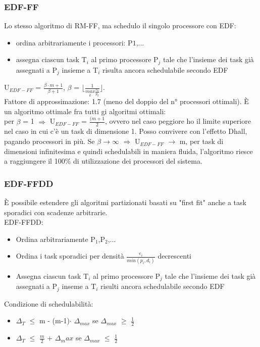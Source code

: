 \documentclass[12pt, oneside]{extbook}
\begin{document}
\subsubsection{EDF-FF}
Lo stesso algoritmo di RM-FF, ma schedulo il singolo processore con EDF:
\begin{itemize}
\item ordina arbitrariamente i processori: P${1}$,...
\item assegna ciascun task T$_{i}$ al primo processore P$_{j}$ tale che l'insieme dei task già assegnati a P$_{j}$ insieme a T$_{i}$ risulta ancora schedulabile secondo EDF
\end{itemize}
U$_{EDF-FF}$ = $\frac{\beta \cdot m + 1}{\beta + 1}$, $\beta$ = $\lfloor \frac{1}{\underset{k}{max}\frac{e_k}{p_k}}\rfloor$.\\ Fattore di approssimazione: 1.7 (meno del doppio del n° processori ottimali). È un algoritmo ottimale fra tutti gi algoritmi ottimali:\\ per $\beta$ = 1 $\Rightarrow$ U$_{EDF-FF}$ = $\frac{(m + 1}{2}$, ovvero nel caso peggiore ho il limite superiore nel caso in cui c'è un task di dimensione 1. Posso convivere con l'effetto Dhall, pagando processori in più. Se $\beta \rightarrow \infty$ $\Rightarrow$ U$_{EDF-FF}$ $\rightarrow$ m, per task di dimensioni infinitesima e quindi schedulabili in maniera fluida, l'algoritmo riesce a raggiungere il 100\% di utilizzazione dei processori del sistema.
\subsubsection{EDF-FFDD}
È possibile estendere gli algoritmi partizionati basati su "first fit" anche a task sporadici con scadenze arbitrarie.\\ EDF-FFDD:
\begin{itemize}
\item Ordina arbitrariamente P$_{1}$,P$_{2}$,...
\item Ordina i task sporadici per densità $\frac{e_i}{min(p_i, d_i)}$ decrescenti
\item Assegna ciascun task T$_{i}$ al primo processore P$_{j}$ tale che l'insieme dei task già assegnati a P$_{j}$ inseme a T$_{i}$ risulti ancora schedulabile secondo EDF
\end{itemize}
Condizione di schedulabilità:
\begin{itemize}
\item $\Delta_T$ $\leq$ m - (m-1)$\cdot$ $\Delta_{max}$ se $\Delta_{max}$ $\geq$ $\frac{1}{2}$
\item $\Delta_T$ $\leq$ $\frac{m}{2}$ + $\Delta_max$ se $\Delta_{max}$ $\leq$ $\frac{1}{2}$
\end{itemize}
\end{document}

